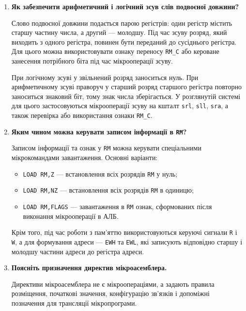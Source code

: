 \documentclass[12pt,a4paper]{article}
\begin{document}
\begin{enumerate}
        \item \textbf{Як забезпечити арифметичний і логічний зсув слів подвоєної довжини?}

        Слово подвоєної довжини подається парою регістрів: один регістр містить старшу частину числа, а другий --- молодшу. Під час зсуву розряд, який виходить з одного регістра, повинен бути переданий до сусіднього регістра. Для цього можна використовувати ознаку переносу \texttt{RM\_C} або кероване занесення потрібного біта під час мікрооперації зсуву.

        При логічному зсуві у звільнений розряд заноситься нуль. При арифметичному зсуві праворуч у старший розряд старшого регістра повторно заноситься знаковий біт, тому знак числа зберігається. У розглянутій системі для цього застосовуються мікрооперації зсуву на кшталт \texttt{srl}, \texttt{sll}, \texttt{sra}, а також перевірка або використання ознаки \texttt{RM\_C}.

        \item \textbf{Яким чином можна керувати записом інформації в \texttt{RM}?}

        Записом інформації та ознак у \texttt{RM} можна керувати спеціальними мікрокомандами завантаження. Основні варіанти:

        \begin{itemize}
            \item \texttt{LOAD RM,Z} --- встановлення всіх розрядів \texttt{RM} у нуль;
            \item \texttt{LOAD RM,NZ} --- встановлення всіх розрядів \texttt{RM} в одиницю;
            \item \texttt{LOAD RM,FLAGS} --- завантаження в \texttt{RM} ознак, сформованих після виконання мікрооперації в АЛБ.
        \end{itemize}

        Крім того, під час роботи з пам'яттю використовуються керуючі сигнали \texttt{R} і \texttt{W}, а для формування адреси --- \texttt{EWH} та \texttt{EWL}, які записують відповідно старшу і молодшу частини адреси до регістра адреси.

        \item \textbf{Поясніть призначення директив мікроасемблера.}

        Директиви мікроасемблера не є мікроопераціями, а задають правила розміщення, початкові значення, конфігурацію зв'язків і допоміжні позначення для трансляції мікропрограми.


\end{enumerate}
\end{document}
